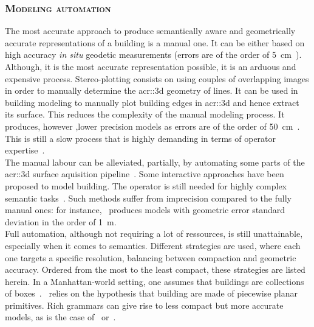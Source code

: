         \subsubsection{\textsc{Modeling automation}}
            The most accurate approach to produce semantically aware and geometrically accurate representations of a building is a manual one.
            It can be either based on high accuracy \textit{in situ} geodetic measurements (errors are of the order of \SI{5}{\cm}~\parencite{kaartinen2005accuracy}).
            Although, it is the most accurate representation possible, it is an arduous and expensive process.
            Stereo-plotting consists on using couples of overlapping images in order to manually determine the \gls{acr::3d} geometry of lines.
            It can be used in building modeling to manually plot building edges in \gls{acr::3d} and hence extract its surface.
            This reduces the complexity of the manual modeling process.
            It produces, however ,lower precision models as errors are of the order of \SI{50}{\cm}~\parencite{jamet1995building}.
            This is still a slow process that is highly demanding in terms of operator expertise~\parencite{ruther2002application}.\\
            The manual labour can be alleviated, partially, by automating some parts of the \gls{acr::3d} surface aquisition pipeline~\parencite{musialski2013survey}.
            Some interactive approaches have been proposed to model building.
            The operator is still needed for highly complex semantic tasks~\parencite{mayunga2005semi, castellazzi2015laser}.
            Such methods suffer from imprecision compared to the fully manual ones: for instance,~\textcite{mayunga2005semi} produces models with geometric error standard deviation in the order of \SI{1}{\m}.\\
            Full automation, although not requiring a lot of ressources, is still unattainable, especially when it comes to semantics.
            Different strategies are used, where each one targets a specific resolution, balancing between compaction and geometric accuracy.
            Ordered from the most to the least compact, these strategies are listed herein.
            In a Manhattan-world setting, one assumes that buildings are collections of boxes~\parencite{vanegas2010building, li2016manhattan}.~\textcite{lafarge2012creating, nan2017polyfit}
            relies on the hypothesis that building are made of piecewise planar primitives.
            Rich grammars can give rise to less compact but more accurate models, as is the case of~\textcite{demir2015procedural} or~\textcite{zeng2018neural}.
